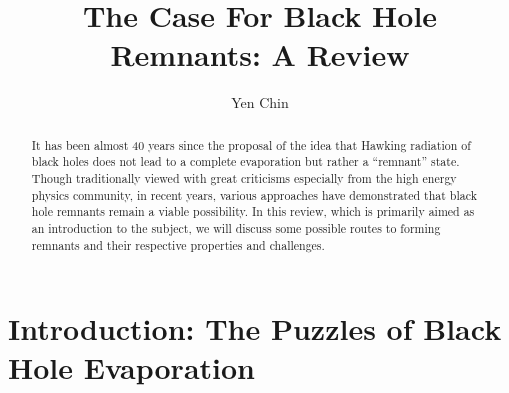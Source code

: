 \documentclass[12pt,preprintnumbers, floatfix, preprintnumbers, letterpaper, superscriptaddress,nofootinbib]{revtex4-2}
\begin{document}
\title{The Case For Black Hole Remnants: A Review}

	
\author{Yen Chin }


\begin{abstract}
It has been almost 40 years since the proposal of the idea that Hawking radiation of black holes does not lead to a complete evaporation but rather a ``remnant'' state. Though traditionally viewed with great criticisms especially from the high energy physics community, in recent years, various approaches have demonstrated that black hole remnants remain a viable possibility. In this review, which is primarily aimed as an introduction to the subject, we will discuss some possible routes to forming remnants and their respective properties and challenges. 
\end{abstract} 

\maketitle
\section{Introduction: The Puzzles of Black Hole Evaporation}
\end{document}
